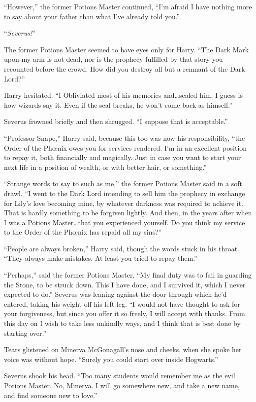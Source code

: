 “However,” the former Potions Master continued, “I’m afraid I have nothing more to say about your father than what I’ve already told you.”

“\emph{Severus!}”

The former Potions Master seemed to have eyes only for Harry. “The Dark Mark upon my arm is not dead, nor is the prophecy fulfilled by that story you recounted before the crowd. How did you destroy all but a remnant of the Dark Lord?”

Harry hesitated. “I Obliviated most of his memories and…sealed him, I guess is how wizards say it. Even if the seal breaks, he won’t come back as himself.”

Severus frowned briefly and then shrugged. “I suppose that is acceptable.”

“Professor Snape,” Harry said, because this too was now his responsibility, “the Order of the Phœnix owes you for services rendered. I’m in an excellent position to repay it, both financially and magically. Just in case you want to start your next life in a position of wealth, or with better hair, or something.”

“Strange words to say to such as me,” the former Potions Master said in a soft drawl. “I went to the Dark Lord intending to sell him the prophecy in exchange for Lily’s love becoming mine, by whatever darkness was required to achieve it. That is hardly something to be forgiven lightly. And then, in the years after when I was a Potions Master…that you experienced yourself. Do you think my service to the Order of the Phœnix has repaid all my sins?”

“People are always broken,” Harry said, though the words stuck in his throat. “They always make mistakes. At least you tried to repay them.”

“Perhaps,” said the former Potions Master. “My final duty was to fail in guarding the Stone, to be struck down. This I have done, and I survived it, which I never expected to do.” Severus was leaning against the door through which he’d entered, taking his weight off his left leg. “I would not have thought to ask for your forgiveness, but since you offer it so freely, I will accept with thanks. From this day on I wish to take less unkindly ways, and I think that is best done by starting over.”

Tears glistened on Minerva McGonagall’s nose and cheeks, when she spoke her voice was without hope. “Surely you could start over inside Hogwarts.”

Severus shook his head. “Too many students would remember me as the evil Potions Master. No, Minerva. I will go somewhere new, and take a new name, and find someone new to love.”

